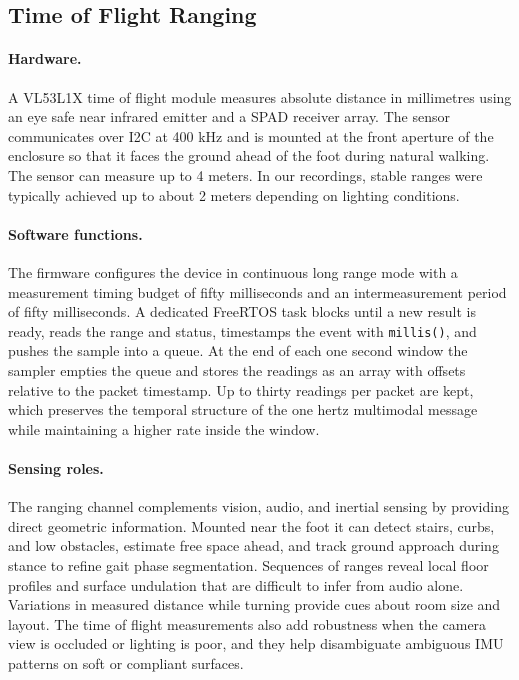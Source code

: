 \documentclass[manuscript,review,anonymous]{acmart}
\begin{document}
\subsection{Time of Flight Ranging}
\paragraph{Hardware.}
A VL53L1X time of flight module measures absolute distance in millimetres using an eye safe near infrared emitter and a SPAD receiver array. The sensor communicates over I2C at 400 kHz and is mounted at the front aperture of the enclosure so that it faces the ground ahead of the foot during natural walking. The sensor can measure up to 4 meters.
In our recordings, stable ranges were typically achieved up to about 2 meters depending on lighting conditions.

\paragraph{Software functions.}
The firmware configures the device in continuous long range mode with a measurement timing budget of fifty milliseconds and an intermeasurement period of fifty milliseconds. A dedicated FreeRTOS task blocks until a new result is ready, reads the range and status, timestamps the event with \texttt{millis()}, and pushes the sample into a queue. At the end of each one second window the sampler empties the queue and stores the readings as an array with offsets relative to the packet timestamp. Up to thirty readings per packet are kept, which preserves the temporal structure of the one hertz multimodal message while maintaining a higher rate inside the window.

\paragraph{Sensing roles.}
The ranging channel complements vision, audio, and inertial sensing by providing direct geometric information. Mounted near the foot it can detect stairs, curbs, and low obstacles, estimate free space ahead, and track ground approach during stance to refine gait phase segmentation. Sequences of ranges reveal local floor profiles and surface undulation that are difficult to infer from audio alone. Variations in measured distance while turning provide cues about room size and layout. The time of flight measurements also add robustness when the camera view is occluded or lighting is poor, and they help disambiguate ambiguous IMU patterns on soft or compliant surfaces.
\end{document}
